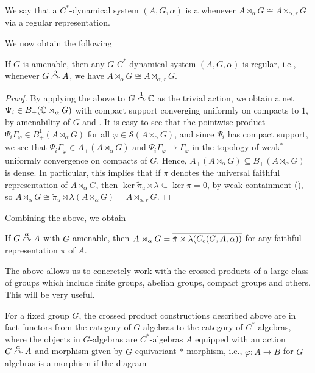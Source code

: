 \begin{definition}
	We say that a $C^*$-dynamical system $(A,G,\alpha)$ is a  whenever $A \rtimes_\alpha G \cong A \rtimes_{\alpha,r} G$ via a regular representation.
\end{definition}
We now obtain the following
\begin{theorem}
If $G$ is amenable, then any $G$ $C^*$-dynamical system $(A,G,\alpha)$ is regular, i.e., whenever $G \stackrel{\alpha}{\curvearrowright} A$, we have $A \rtimes_\alpha G \cong A \rtimes_{\alpha,r}G$.
\label{cross:amenable}
\end{theorem}
\begin{proof}
By applying the above to $G \stackrel{1}{\curvearrowright} \mathbb{C}$ as the trivial action, we obtain a net $\Psi_i \in B_{+}(\mathbb{C} \rtimes_\alpha G)$ with compact support converging uniformly on compacts to $1$, by amenability of $G$ and \cite[Lemma 7.2.4]{pedersenalgauto}. It is easy to see that the pointwise product $\Psi_i \Gamma_\varphi \in B_+^1(A \rtimes_\alpha G)$ for all $\varphi \in \mathcal{S}(A \rtimes_\alpha G)$, and since $\Psi_i$ has compact support, we see that $\Psi_i \Gamma_\varphi \in A_+(A \rtimes_\alpha G)$ and $\Psi_i \Gamma_\varphi \to \Gamma_\varphi$ in the topology of weak$^*$ uniformly convergence on compacts of $G$. Hence, $A_+(A \rtimes_\alpha G) \subseteq B_+(A \rtimes_\alpha G)$ is dense. In particular, this implies that if $\pi$ denotes the universal faithful representation of $A \rtimes_\alpha G$, then $\ker \tilde \pi_u \rtimes \lambda \subseteq \ker \pi = 0$, by weak containment (\cite[80]{dixmier1969c}), so $A \rtimes_\alpha G \cong \tilde \pi_u \rtimes \lambda( A \rtimes_\alpha G) = A \rtimes_{\alpha,r}G$.
\end{proof}
Combining the above, we obtain
\begin{corollary}
If $G \stackrel{\alpha}{\curvearrowright} A$ with $G$ amenable, then $A \rtimes_\alpha G = \overline{\tilde \pi \rtimes \lambda (C_c(G,A,\alpha))}$ for any faithful representation $\pi$ of $A$.
\end{corollary}
The above allows us to concretely work with the crossed products of a large class of groups which include finite groups, abelian groups, compact groups and others. This will be very useful.

For a fixed group $G$, the crossed product constructions described above are in fact functors from the category of $G$-algebras to the category of $C^*$-algebras, where the objects in $G$-algebras are $C^*$-algebras $A$ equipped with an action $G \stackrel{\alpha}{\curvearrowright} A$ and morphism given by $G$-equivariant $*$-morphism, i.e., $\varphi \colon A \to B$ for $G$-algebras is a morphism if the diagram

